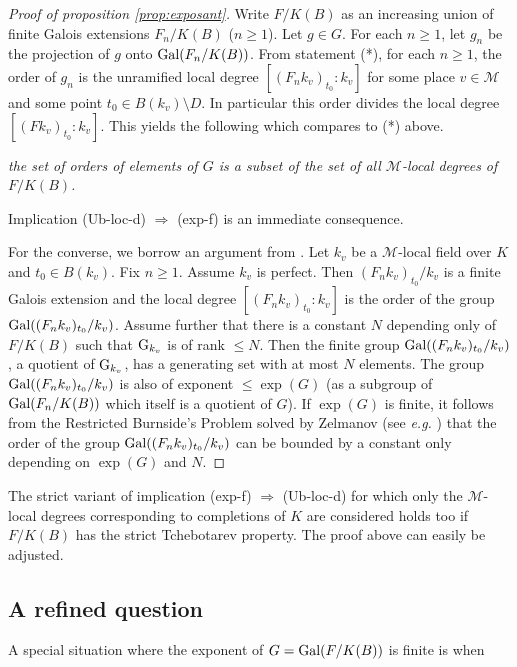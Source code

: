\documentclass[12pt,english]{amsart}
\newtheorem{twisting lemma}[theorem]{Twisting lemma}
\begin{document}
\begin{proof}[Proof of proposition \ref{prop:exposant}] Write $F/K(B)$ as an increasing union of finite Galois extensions $F_n/K(B)$ ($n\geq 1$). Let $g\in G$. For each $n\geq 1$, let $g_n$ be the projection of $g$ onto ${\hbox{\rm Gal}}(F_n/K(B))$.  From statement (*), for each $n\geq 1$, the order of $g_n$ is the unramified local degree $[(F_nk_v)_{t_0}:k_v]$ for some place $v\in {\mathcal M}$ and some point $t_0 \in B(k_v)\setminus D$. In particular this order divides the local degree $[(Fk_v)_{t_0}:k_v]$. This yields the following which compares to (*) above.
\vskip 2mm

\noindent {\rm (**)} {\it the set of orders of elements of $G$ is a subset of the set of all ${\mathcal M}$-local degrees of $F/K(B)$.} 
\vskip 2mm

\noindent
Implication (Ub-loc-d) $\Rightarrow$ (exp-f) is an immediate consequence.

For the converse, we borrow an argument from \cite{Ch}. Let $k_v$ be a ${\mathcal M}$-local field over $K$ and $t_0\in B(k_v)$. Fix $n\geq 1$. Assume $k_v$ is perfect. Then $(F_nk_v)_{t_0}/k_v$ is a finite Galois extension and the local degree $[(F_nk_v)_{t_0}:k_v]$ is the order of the group ${\hbox{\rm Gal}}((F_nk_v)_{t_0}/k_v)$. Assume further that there is a constant $N$ depending only of $F/K(B)$ such that ${\hbox{\rm G}}_{k_v}$ is of rank $\leq N$. Then the finite group ${\hbox{\rm Gal}}((F_nk_v)_{t_0}/k_v)$, a quotient of ${\hbox{\rm G}}_{k_v}$, has a generating set with at most $N$ elements. The group ${\hbox{\rm Gal}}((F_nk_v)_{t_0}/k_v)$ is also of exponent $\leq \exp(G)$ (as a subgroup of ${\hbox{\rm Gal}}(F_n/K(B))$ which itself is a quotient of $G$). If $\exp(G)$ is finite, it follows from the Restricted Burnside's Problem solved by Zelmanov (see {\it e.g.} \cite{vaughan}) that the order of the group ${\hbox{\rm Gal}}((F_nk_v)_{t_0}/k_v)$ can be bounded by a constant only depending on $\exp(G)$ and $N$. 
\end{proof}

The strict variant of implication (exp-f) $\Rightarrow$ (Ub-loc-d) for which only the ${\mathcal M}$-local degrees corresponding to completions of $K$ are considered holds too if $F/K(B)$ has the strict Tchebotarev property. The proof above can easily be adjusted.

\subsection{A refined question} \label{ssec:refinedquestion}
A special situation where the exponent of $G={\hbox{\rm Gal}}(F/K(B))$ is finite is when 
\vskip 2mm 
\end{document}
